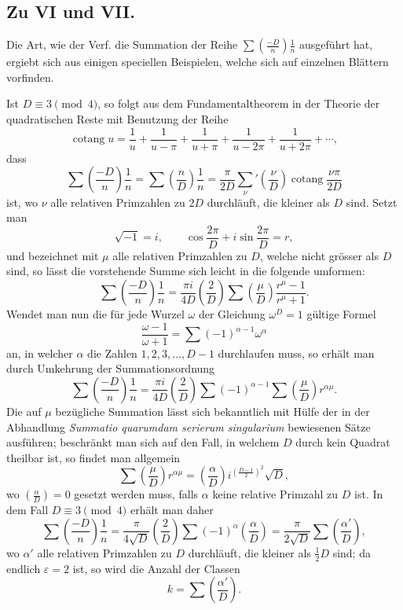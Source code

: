 \documentclass[12pt]{article}
\newcommand{\cotang}{\operatorname{cotang}}
\begin{document}
\subsection*{Zu VI und VII.}

Die Art, wie der Verf. die Summation der Reihe \(\sum\left(\frac{-D}{n}\right)\frac1n\) ausgeführt hat, ergiebt sich aus einigen speciellen Beispielen, welche sich auf einzelnen Blättern vorfinden.

Ist \(D\equiv3\pmod4\), so folgt aus dem Fundamentaltheorem in der Theorie der quadratischen Reste mit Benutzung der Reihe
\[
\cotang u=\frac1u+\frac1{u-\pi}+\frac1{u+\pi}+\frac1{u-2\pi}+\frac1{u+2\pi}+\cdots,
\]
dass
\[
\sum\left(\frac{-D}{n}\right)\frac1n
=\sum\left(\frac{n}{D}\right)\frac1n
=\frac{\pi}{2D}\sum_{\nu}'\left(\frac{\nu}{D}\right)\cotang\frac{\nu\pi}{2D}
\]
ist, wo \(\nu\) alle relativen Primzahlen zu \(2D\) durchläuft, die kleiner als \(D\) sind. Setzt man
\[
\sqrt{-1}=i,\qquad \cos\frac{2\pi}{D}+i\sin\frac{2\pi}{D}=r,
\]
und bezeichnet mit \(\mu\) alle relativen Primzahlen zu \(D\), welche nicht grösser als \(D\) sind, so lässt die vorstehende Summe sich leicht in die folgende umformen:
\[
\sum\left(\frac{-D}{n}\right)\frac1n
=\frac{\pi i}{4D}\left(\frac{2}{D}\right)
\sum\left(\frac{\mu}{D}\right)\frac{r^\mu-1}{r^\mu+1}.
\]
Wendet man nun die für jede Wurzel \(\omega\) der Gleichung \(\omega^D=1\) gültige Formel
\[
\frac{\omega-1}{\omega+1}=\sum (-1)^{\alpha-1}\omega^\alpha
\]
an, in welcher \(\alpha\) die Zahlen \(1,2,3,\ldots,D-1\) durchlaufen muss, so erhält man durch Umkehrung der Summationsordnung
\[
\sum\left(\frac{-D}{n}\right)\frac1n
=\frac{\pi i}{4D}\left(\frac{2}{D}\right)
\sum(-1)^{\alpha-1}\sum\left(\frac{\mu}{D}\right)r^{\alpha\mu}.
\]
Die auf \(\mu\) bezügliche Summation lässt sich bekanntlich mit Hülfe der in der Abhandlung \emph{Summatio quarumdam serierum singularium} bewiesenen Sätze ausführen; beschränkt man sich auf den Fall, in welchem \(D\) durch kein Quadrat theilbar ist, so findet man allgemein
\[
\sum\left(\frac{\mu}{D}\right)r^{\alpha\mu}
=\left(\frac{\alpha}{D}\right)i^{\left(\frac{D-1}{2}\right)^2}\sqrt D,
\]
wo \(\left(\frac{\alpha}{D}\right)=0\) gesetzt werden muss, falls \(\alpha\) keine relative Primzahl zu \(D\) ist. In dem Fall \(D\equiv3\pmod4\) erhält man daher
\[
\sum\left(\frac{-D}{n}\right)\frac1n
=\frac{\pi}{4\sqrt D}\left(\frac{2}{D}\right)\sum(-1)^\alpha\left(\frac{\alpha}{D}\right)
=\frac{\pi}{2\sqrt D}\sum\left(\frac{\alpha'}{D}\right),
\]
wo \(\alpha'\) alle relativen Primzahlen zu \(D\) durchläuft, die kleiner als \(\frac12D\) sind; da endlich \(\varepsilon=2\) ist, so wird die Anzahl der Classen
\[
k=\sum\left(\frac{\alpha'}{D}\right).
\]
\end{document}
